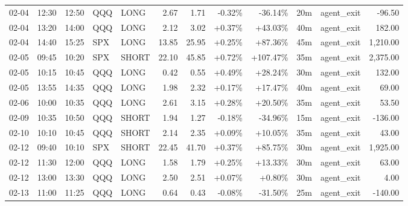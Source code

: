 \documentclass[11pt,a4paper,twoside]{article}
\begin{document}
\begin{center}
\begin{longtable}{>{\color{txtmain}}l l l l l r r r r r >{\color{txtmain}}l r}
02-04 & 12:30 & 12:50 & QQQ & LONG & 2.67 & 1.71 & \textcolor{lossred}{-0.32\%} & \textcolor{lossred}{-36.14\%} & 20m & agent\_exit & \textcolor{lossred}{-96.50} \\
02-04 & 13:20 & 14:00 & QQQ & LONG & 2.12 & 3.02 & \textcolor{wingreen}{+0.37\%} & \textcolor{wingreen}{+43.03\%} & 40m & agent\_exit & \textcolor{wingreen}{182.00} \\
02-04 & 14:40 & 15:25 & SPX & LONG & 13.85 & 25.95 & \textcolor{wingreen}{+0.25\%} & \textcolor{wingreen}{+87.36\%} & 45m & agent\_exit & \textcolor{wingreen}{1,210.00} \\
02-05 & 09:45 & 10:20 & SPX & SHORT & 22.10 & 45.85 & \textcolor{wingreen}{+0.72\%} & \textcolor{wingreen}{+107.47\%} & 35m & agent\_exit & \textcolor{wingreen}{2,375.00} \\
02-05 & 10:15 & 10:45 & QQQ & LONG & 0.42 & 0.55 & \textcolor{wingreen}{+0.49\%} & \textcolor{wingreen}{+28.24\%} & 30m & agent\_exit & \textcolor{wingreen}{132.00} \\
02-05 & 13:55 & 14:35 & QQQ & LONG & 1.98 & 2.32 & \textcolor{wingreen}{+0.17\%} & \textcolor{wingreen}{+17.47\%} & 40m & agent\_exit & \textcolor{wingreen}{69.00} \\
02-06 & 10:00 & 10:35 & QQQ & LONG & 2.61 & 3.15 & \textcolor{wingreen}{+0.28\%} & \textcolor{wingreen}{+20.50\%} & 35m & agent\_exit & \textcolor{wingreen}{53.50} \\
02-09 & 10:35 & 10:50 & QQQ & SHORT & 1.94 & 1.27 & \textcolor{lossred}{-0.18\%} & \textcolor{lossred}{-34.96\%} & 15m & agent\_exit & \textcolor{lossred}{-136.00} \\
02-10 & 10:10 & 10:45 & QQQ & SHORT & 2.14 & 2.35 & \textcolor{wingreen}{+0.09\%} & \textcolor{wingreen}{+10.05\%} & 35m & agent\_exit & \textcolor{wingreen}{43.00} \\
02-12 & 09:40 & 10:10 & SPX & SHORT & 22.45 & 41.70 & \textcolor{wingreen}{+0.37\%} & \textcolor{wingreen}{+85.75\%} & 30m & agent\_exit & \textcolor{wingreen}{1,925.00} \\
02-12 & 11:30 & 12:00 & QQQ & LONG & 1.58 & 1.79 & \textcolor{wingreen}{+0.25\%} & \textcolor{wingreen}{+13.33\%} & 30m & agent\_exit & \textcolor{wingreen}{63.00} \\
02-12 & 13:00 & 13:30 & QQQ & LONG & 2.50 & 2.51 & \textcolor{wingreen}{+0.07\%} & \textcolor{wingreen}{+0.80\%} & 30m & agent\_exit & \textcolor{wingreen}{4.00} \\
02-13 & 11:00 & 11:25 & QQQ & LONG & 0.64 & 0.43 & \textcolor{lossred}{-0.08\%} & \textcolor{lossred}{-31.50\%} & 25m & agent\_exit & \textcolor{lossred}{-140.00} \\

\end{longtable}
\end{center}
\end{document}
